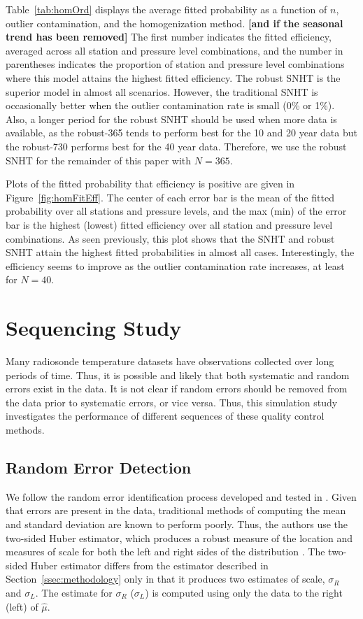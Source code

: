 \documentclass[12pt]{article}
\begin{document}
\begin{doublespacing}
Table~\ref{tab:homOrd} displays the average fitted probability as a function of $n$, outlier contamination, and the homogenization method.  \textbf{[and if the seasonal trend has been removed]}  The first number indicates the fitted efficiency, averaged across all station and pressure level combinations, and the number in parentheses indicates the proportion of station and pressure level combinations where this model attains the highest fitted efficiency.  The robust SNHT is the superior model in almost all scenarios.  However, the traditional SNHT is occasionally better when the outlier contamination rate is small (0\% or 1\%).  Also, a longer period for the robust SNHT should be used when more data is available, as the robust-365 tends to perform best for the 10 and 20 year data but the robust-730 performs best for the 40 year data.  Therefore, we use the robust SNHT for the remainder of this paper with $N=365$.

Plots of the fitted probability that efficiency is positive are given in Figure~\ref{fig:homFitEff}.  The center of each error bar is the mean of the fitted probability over all stations and pressure levels, and the max (min) of the error bar is the highest (lowest) fitted efficiency over all station and pressure level combinations.  As seen previously, this plot shows that the SNHT and robust SNHT attain the highest fitted probabilities in almost all cases.  Interestingly, the efficiency seems to improve as the outlier contamination rate increases, at least for $N=40$.

\section{Sequencing Study}

Many radiosonde temperature datasets have observations collected over long periods of time.  Thus, it is possible and likely that both systematic and random errors exist in the data.  It is not clear if random errors should be removed from the data prior to systematic errors, or vice versa.  Thus, this simulation study investigates the performance of different sequences of these quality control methods.

\subsection{Random Error Detection}
\label{sec:ranErr}
We follow the random error identification process developed and tested in \cite{bell14}.  Given that errors are present in the data, traditional methods of computing the mean and standard deviation are known to perform poorly.  Thus, the authors use the two-sided Huber estimator, which produces a robust measure of the location and measures of scale for both the left and right sides of the distribution \cite{huber11}.  The two-sided Huber estimator differs from the estimator described in Section~\ref{ssec:methodology} only in that it produces two estimates of scale, $\sigma_R$ and $\sigma_L$.  The estimate for $\sigma_R$ ($\sigma_L$) is computed using only the data to the right (left) of $\hat{\mu}$.


\end{doublespacing}
\end{document}
